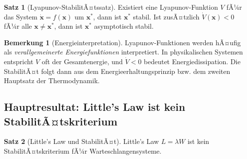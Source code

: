 ﻿\documentclass[a4paper,12pt]{scrreprt}
\theoremstyle{definition}
\newtheorem{bemerkung}{Bemerkung}[section]
\newtheorem{satz}{Satz}[section]
\begin{document}
\begin{satz}[Lyapunov-StabilitÃ¤tssatz]
	Existiert eine Lyapunov-Funktion $V$ fÃ¼r das System $\dot{\mathbf{x}} = f(\mathbf{x})$ um $\mathbf{x}^*$, dann ist $\mathbf{x}^*$ stabil. Ist zusÃ¤tzlich $\dot{V}(\mathbf{x}) < 0$ fÃ¼r alle $\mathbf{x} \neq \mathbf{x}^*$, dann ist $\mathbf{x}^*$ asymptotisch stabil.
\end{satz}

\begin{bemerkung}[Energieinterpretation]
	Lyapunov-Funktionen werden hÃ¤ufig als \textit{verallgemeinerte Energiefunktionen} interpretiert. In physikalischen Systemen entspricht $V$ oft der Gesamtenergie, und $\dot{V} < 0$ bedeutet Energiedissipation. Die StabilitÃ¤t folgt dann aus dem Energieerhaltungsprinzip bzw. dem zweiten Hauptsatz der Thermodynamik.
\end{bemerkung}

\subsection{Hauptresultat: Little's Law ist kein StabilitÃ¤tskriterium}

\begin{satz}[Little's Law und StabilitÃ¤t]
	Little's Law $L = \lambda W$ ist kein StabilitÃ¤tskriterium fÃ¼r Warteschlangensysteme.
\end{satz}
\end{document}
